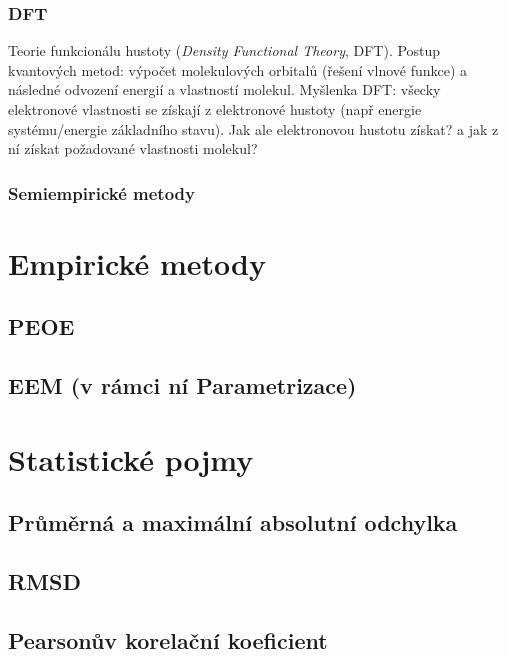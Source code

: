

\subsubsection{DFT}
Teorie funkcionálu hustoty (\textit{Density Functional Theory}, DFT). Postup kvantových metod: výpočet molekulových orbitalů (řešení vlnové funkce) a následné odvození energií a vlastností molekul. Myšlenka DFT: všecky elektronové vlastnosti se získají z elektronové hustoty (např energie systému/energie základního stavu). Jak ale elektronovou hustotu získat? a jak z ní získat požadované vlastnosti molekul? 

\subsubsection{Semiempirické metody}

\section{Empirické metody}
\subsection{PEOE}
\subsection{EEM (v rámci ní Parametrizace)}
\section{Statistické pojmy}
\subsection{Průměrná a maximální absolutní odchylka}
\subsection{RMSD}
\subsection{Pearsonův korelační koeficient}



